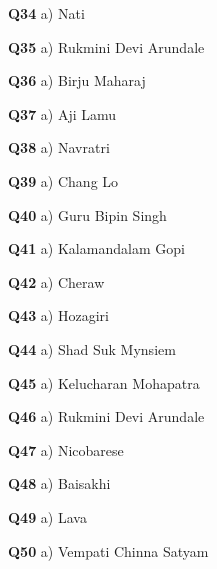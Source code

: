 \textbf{Q34} a) Nati\par
\textbf{Q35} a) Rukmini Devi Arundale\par
\textbf{Q36} a) Birju Maharaj\par
\textbf{Q37} a) Aji Lamu\par
\textbf{Q38} a) Navratri\par
\textbf{Q39} a) Chang Lo\par
\textbf{Q40} a) Guru Bipin Singh\par
\textbf{Q41} a) Kalamandalam Gopi\par
\textbf{Q42} a) Cheraw\par
\textbf{Q43} a) Hozagiri\par
\textbf{Q44} a) Shad Suk Mynsiem\par
\textbf{Q45} a) Kelucharan Mohapatra\par
\textbf{Q46} a) Rukmini Devi Arundale\par
\textbf{Q47} a) Nicobarese\par
\textbf{Q48} a) Baisakhi\par
\textbf{Q49} a) Lava\par
\textbf{Q50} a) Vempati Chinna Satyam\par